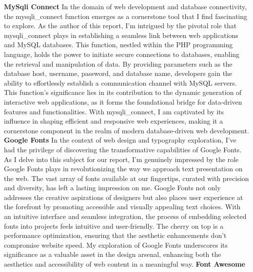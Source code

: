 \newline
\newline
\textbf{MySqli Connect}
\newline
In the domain of web development and database connectivity, the mysqli\_connect function emerges as a cornerstone tool that I find fascinating to explore. As the author of this report, I'm intrigued by the pivotal role that mysqli\_connect plays in establishing a seamless link between web applications and MySQL databases. This function, nestled within the PHP programming language, holds the power to initiate secure connections to databases, enabling the retrieval and manipulation of data. By providing parameters such as the database host, username, password, and database name, developers gain the ability to effortlessly establish a communication channel with MySQL servers. This function's significance lies in its contribution to the dynamic generation of interactive web applications, as it forms the foundational bridge for data-driven features and functionalities. With mysqli\_connect, I am captivated by its influence in shaping efficient and responsive web experiences, making it a cornerstone component in the realm of modern database-driven web development.
\newline
\newline
\textbf{Google Fonts}
\newline
In the context of web design and typography exploration, I've had the privilege of discovering the transformative capabilities of Google Fonts. As I delve into this subject for our report, I'm genuinely impressed by the role Google Fonts plays in revolutionizing the way we approach text presentation on the web. The vast array of fonts available at our fingertips, curated with precision and diversity, has left a lasting impression on me. Google Fonts not only addresses the creative aspirations of designers but also places user experience at the forefront by promoting accessible and visually appealing text choices. With an intuitive interface and seamless integration, the process of embedding selected fonts into projects feels intuitive and user-friendly. The cherry on top is a performance optimization, ensuring that the aesthetic enhancements don't compromise website speed. My exploration of Google Fonts underscores its significance as a valuable asset in the design arsenal, enhancing both the aesthetics and accessibility of web content in a meaningful way.
\newline
\newline
\textbf{Font Awesome }
